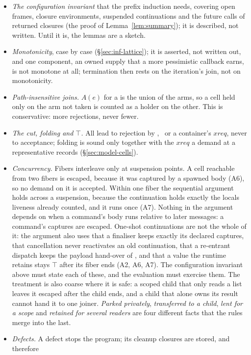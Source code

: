 \begin{itemize}
\item \emph{The configuration invariant} that the prefix induction needs, covering open frames, closure
environments, suspended continuations and the future calls of returned closures (the proof of
Lemma~\ref{lem:summary}); it is described, not written. Until it is, the lemmas are a sketch.
\item \emph{Monotonicity}, case by case (\S\ref{sec:inf-lattice}); it is asserted, not written out, and one
component, an owned supply that a more pessimistic callback earns, is not monotone at all; termination
then rests on the iteration's join, not on monotonicity.
\item \emph{Path-insensitive joins.} $A(e)$ for a  is the union of the arms, so a cell held
only on the arm not taken is counted as a holder on the other. This is conservative: more rejections,
never fewer.
\item \emph{The cut, folding and $\top$.} All lead to rejection by \Known, \Dead\ or a container's $\mathit{xreq}$, never to acceptance; folding is sound only together with the $\mathit{xreq}$ a demand at a representative records (\S\ref{sec:model-cells}).
\item \emph{Concurrency.} Fibers interleave only at suspension points. A cell reachable from two
fibers is escaped, because it was captured by a spawned body (A6), so no demand on it is accepted.
Within one fiber the sequential argument holds across a suspension, because the continuation holds
exactly the locals liveness already counted, and it runs once (A7). Nothing in the argument depends on
when a command's body runs relative to later messages: a command's captures are escaped. One-shot
continuations are not the whole of it: the argument also uses that a finaliser keeps exactly its declared
captures, that cancellation never reactivates an old continuation, that a re-entrant dispatch keeps the
payload hand-over of , and that a value the runtime retains stays $\top$ after its fiber ends (A2,
A6, A7). The configuration invariant above must state each of these, and the evaluation must exercise
them. The treatment is also coarse where it is safe: a scoped child that only reads a list leaves it
escaped after the child ends, and a child that alone owns its result cannot hand it to one joiner.
\emph{Parked privately}, \emph{transferred to a child}, \emph{lent for a scope} and \emph{retained for
several readers} are four different facts that the rules merge into the last.
\item \emph{Defects.} A defect stops the program; its cleanup closures are stored, and therefore

\end{itemize}
